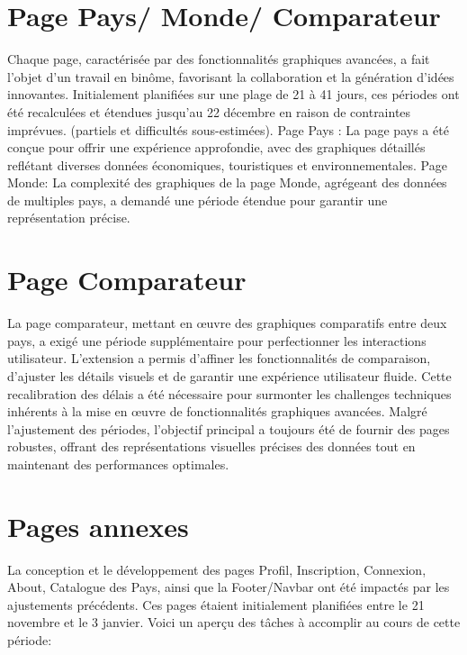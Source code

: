 \documentclass[mstat,12pt]{unswthesis}
\begin{document}
\begin{adjustwidth}{-2cm}{}
\hypertarget{page-pays-monde-comparateur}{%
\section{Page Pays/ Monde/
Comparateur}\label{page-pays-monde-comparateur}}

Chaque page, caractérisée par des fonctionnalités graphiques avancées, a
fait l'objet d'un travail en binôme, favorisant la collaboration et la
génération d'idées innovantes. Initialement planifiées sur une plage de
21 à 41 jours, ces périodes ont été recalculées et étendues jusqu'au 22
décembre en raison de contraintes imprévues. (partiels et difficultés
sous-estimées). Page Pays : La page pays a été conçue pour offrir une
expérience approfondie, avec des graphiques détaillés reflétant diverses
données économiques, touristiques et environnementales. Page Monde: La
complexité des graphiques de la page Monde, agrégeant des données de
multiples pays, a demandé une période étendue pour garantir une
représentation précise.

\hypertarget{page-comparateur}{%
\section{Page Comparateur}\label{page-comparateur}}

La page comparateur, mettant en œuvre des graphiques comparatifs entre
deux pays, a exigé une période supplémentaire pour perfectionner les
interactions utilisateur. L'extension a permis d'affiner les
fonctionnalités de comparaison, d'ajuster les détails visuels et de
garantir une expérience utilisateur fluide. Cette recalibration des
délais a été nécessaire pour surmonter les challenges techniques
inhérents à la mise en œuvre de fonctionnalités graphiques avancées.
Malgré l'ajustement des périodes, l'objectif principal a toujours été de
fournir des pages robustes, offrant des représentations visuelles
précises des données tout en maintenant des performances optimales.

\hypertarget{pages-annexes}{%
\section{Pages annexes}\label{pages-annexes}}

La conception et le développement des pages Profil, Inscription,
Connexion, About, Catalogue des Pays, ainsi que la Footer/Navbar ont été
impactés par les ajustements précédents. Ces pages étaient initialement
planifiées entre le 21 novembre et le 3 janvier. Voici un aperçu des
tâches à accomplir au cours de cette période:


\end{adjustwidth}
\end{document}
